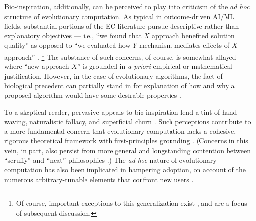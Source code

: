 Bio-inspiration, additionally, can be perceived to play into criticism of the \textit{ad hoc} structure of evolutionary computation.
As typical in outcome-driven AI/ML fields, substantial portions of the EC literature pursue descriptive rather than explanatory objectives --- i.e., ``we found that $X$ approach benefited solution quality'' as opposed to ``we evaluated how $Y$ mechanism mediates effects of $X$ approach'' \citep{lipton2019troubling,hutson2018ai,sculley2018winner,del2019bio}.%
\footnote{%
  Of course, important exceptions to this generalization exist \citep{TODO}, and are a focus of subsequent discussion.
}
The substance of such concerns, of course, is somewhat allayed where ``new approach $X$'' is grounded in \textit{a priori} empirical or mathematical justification.
However, in the case of evolutionary algorithms, the fact of biological precedent can partially stand in for explanation of how and why a proposed algorithm would have some desirable properties \citep{sorensen2015metaheuristics}.

To a skeptical reader, pervasive appeals to bio-inspiration lend a tint of hand-waving, naturalistic fallacy, and superficial churn \citep{wortmann2020does,sorensen2015metaheuristics}.
Such perceptions contribute to a more fundamental concern that evolutionary computation lacks a cohesive, rigorous theoretical framework with first-principles grounding \citep{worzel2003genetic}.
(Concerns in this vein, in part, also persist from more general and longstanding contention between ``scruffy'' and ``neat'' philosophies \citep[p. 16]{jones2008artificial} \citep{minsky1991logical}.)
The \textit{ad hoc} nature of evolutionary computation has also been implicated in hampering adoption, on account of the numerous arbitrary-tunable elements that confront new users \citep{oneil2010open}.

